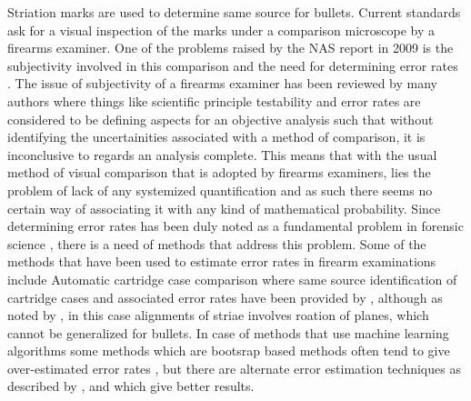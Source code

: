 \documentclass[12pt]{article}
\begin{document}

Striation marks are used to determine same source for bullets. Current
standards ask for a visual inspection of the marks under a comparison
microscope by a firearms examiner. One of the problems raised by the NAS
report in 2009 is the subjectivity involved in this comparison and the
need for determining error rates \citep{NAS:2009}. The issue of
subjectivity of a firearms examiner has been reviewed by many authors
where things like scientific principle testability and error rates are
considered to be defining aspects for an objective analysis such that
without identifying the uncertainities associated with a method of
comparison, it is inconclusive to regards an analysis complete. This
means that with the usual method of visual comparison that is adopted by
firearms examiners, lies the problem of lack of any systemized
quantification and as such there seems no certain way of associating it
with any kind of mathematical probability. Since determining error rates
has been duly noted as a fundamental problem in forensic science
\citep{NAS:2009}, there is a need of methods that address this problem.
Some of the methods that have been used to estimate error rates in
firearm examinations include Automatic cartridge case comparison where
same source identification of cartridge cases and associated error rates
have been provided by \citep{riva}, although as noted by \citep{aoas},
in this case alignments of striae involves roation of planes, which
cannot be generalized for bullets. In case of methods that use machine
learning algorithms some methods which are bootsrap based methods often
tend to give over-estimated error rates \citep{efron}, but there are
alternate error estimation techniques as described by \citep{aoas},
\citep{efron} and \citep{vorburger2016} which give better results.
\end{document}
